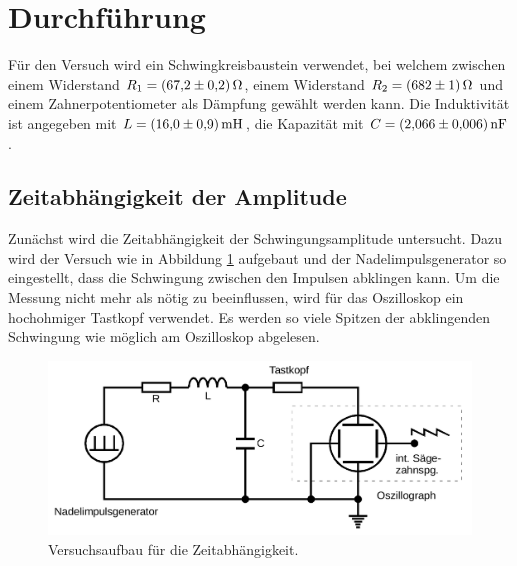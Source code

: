 \section{Durchführung}
\label{sec:Durchführung}
Für den Versuch wird ein Schwingkreisbaustein verwendet, bei welchem zwischen einem Widerstand
$R_1=\SI{67.2\pm0.2}{\ohm}$, einem Widerstand $R_2=\SI{682\pm1}{\ohm}$ und einem Zahnerpotentiometer als
Dämpfung gewählt werden kann. Die Induktivität ist angegeben mit $L=\SI{16\pm0.9}{\milli\henry}$, die
Kapazität mit $C=\SI{2.066\pm0.006}{\nano\farad}$.
\subsection{Zeitabhängigkeit der Amplitude}
Zunächst wird die Zeitabhängigkeit der Schwingungsamplitude untersucht.
Dazu wird der Versuch wie in Abbildung \ref{fig:aufbau1} aufgebaut und der Nadelimpulsgenerator so eingestellt,
dass die Schwingung zwischen den Impulsen abklingen kann.
Um die Messung nicht mehr als nötig zu beeinflussen, wird für das Oszilloskop ein hochohmiger Tastkopf verwendet.
Es werden so viele Spitzen der abklingenden Schwingung wie möglich am Oszilloskop abgelesen.
\begin{figure}[H]
    \centering
    \caption{Versuchsaufbau für die Zeitabhängigkeit.\cite{v354}}
    \label{fig:aufbau1}
    \includegraphics[width=\textwidth]{content/aufbau1.png}
\end{figure}
\noindent
%
